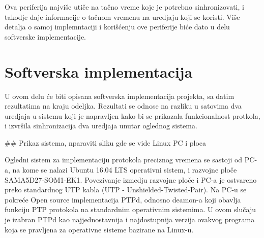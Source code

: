 \documentclass[a4paper,12pt, master]{etf}
\begin{document}
    Ova periferija najvi\v{s}e uti\v{c}e na ta\v{c}no vreme koje je potrebno
    sinhronizovati, i takodje daje informacije o ta\v{c}nom vremenu na uredjaju
    koji se koristi. Vi\v{s}e detalja o samoj implemntaciji i kori\v{s}\'{c}enju
    ove periferije bi\'{c}e dato u delu softverske implementacije.

	\newpage

	\chapter{Softverska implementacija}

    U ovom delu \'{c}e biti opisana softverska implementacija projekta, sa
	datim rezultatima na kraju odeljka. Rezultati se odnose na razliku u 
	satovima dva uredjaja u sistemu koji je napravljen kako bi se prikazala    
	funkcionalnost protkola, i izvr\v{s}ila sinhronizacija dva uredjaja unutar 
	oglednog sistema.

	\#\# Prikaz sistema, nparaviti sliku gde se vide Linux PC i ploca

    Ogledni sistem za implementaciju protokola preciznog vremena se sastoji
	od PC-a, na kome se nalazi Ubuntu 16.04 LTS operativni sistem, i razvojne 
	plo\v{c}e SAMA5D27-SOM1-EK1. Povezivanje izmedju razvojne plo\v{c}e i PC-a 
	je ostvareno preko standardnog UTP kabla (UTP - Unshielded-Twisted-Pair). 
	Na PC-u se pokre\'{c}e Open source implementacija PTPd, odnosno deamon-a 
	koji obavlja funkciju PTP protokola na standardnim operativnim sistemima. U 
	ovom slu\v{c}aju je izabran PTPd kao najjednostavnija i najdostupnija 
	verzija ovakvog programa koja se pravljena za operativne sisteme bazirane 
	na Linux-u.
\end{document}
